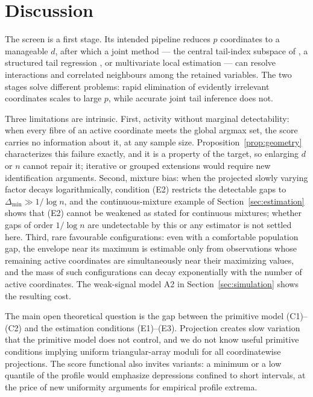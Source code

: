 \section{Discussion}\label{sec:discussion}

The screen is a first stage. Its intended
pipeline reduces $p$ coordinates to a manageable $d$, after which a joint
method --- the central tail-index subspace of \citet{gardesPodgorny2025}, a
structured tail regression \citep{wangTsai2009,sasakiTaoWang2026}, or
multivariate local estimation --- can resolve interactions and correlated
neighbours among the retained variables. The two stages solve different
problems: rapid elimination of evidently irrelevant coordinates scales
to large $p$, while accurate joint tail inference does not.

Three limitations are intrinsic. First, activity without marginal
detectability: when every fibre of an active coordinate meets the global
argmax set, the score carries no information about it, at any sample size.
Proposition~\ref{prop:geometry} characterizes this failure exactly, and it
is a property of the target, so enlarging $d$ or $n$ cannot repair it;
iterative or grouped extensions would require new identification arguments.
Second, mixture bias: when the projected slowly varying factor decays
logarithmically, condition (E2) restricts the detectable gaps to
$\Delta_{\min}\gg1/\log n$, and the continuous-mixture example of
Section~\ref{sec:estimation} shows that (E2) cannot be weakened as
stated for continuous mixtures; whether gaps of order $1/\log n$ are
undetectable by this or any estimator is not settled here. Third, rare favourable configurations:
even with a comfortable population gap, the envelope near its maximum is
estimable only from observations whose remaining active coordinates are
simultaneously near their maximizing values, and the mass of such
configurations can decay exponentially with the number of active
coordinates. The weak-signal model A2 in Section~\ref{sec:simulation}
shows the resulting cost.

The main open theoretical question is the gap between the primitive model
(C1)--(C2) and the estimation conditions (E1)--(E3). Projection creates
slow variation that the primitive model does not control, and we do not
know useful primitive conditions implying uniform triangular-array moduli
for all coordinatewise projections. The score functional also invites
variants: a minimum or a low quantile of the profile would emphasize
depressions confined to short intervals, at the price of new uniformity
arguments for empirical profile extrema.


